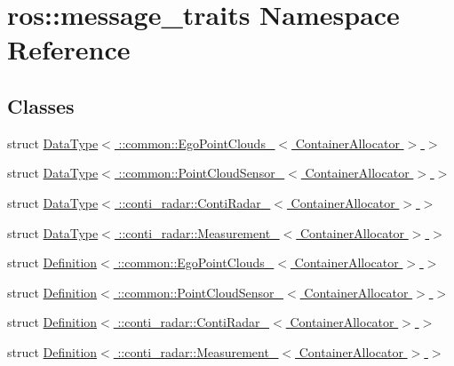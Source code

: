 \hypertarget{namespaceros_1_1message__traits}{}\section{ros\+:\+:message\+\_\+traits Namespace Reference}
\label{namespaceros_1_1message__traits}
\subsection*{Classes}
\begin{DoxyCompactItemize}
\item 
struct \hyperlink{structros_1_1message__traits_1_1DataType_3_01_1_1common_1_1EgoPointClouds___3_01ContainerAllocator_01_4_01_4}{Data\+Type$<$ \+::common\+::\+Ego\+Point\+Clouds\+\_\+$<$ Container\+Allocator $>$ $>$}
\item 
struct \hyperlink{structros_1_1message__traits_1_1DataType_3_01_1_1common_1_1PointCloudSensor___3_01ContainerAllocator_01_4_01_4}{Data\+Type$<$ \+::common\+::\+Point\+Cloud\+Sensor\+\_\+$<$ Container\+Allocator $>$ $>$}
\item 
struct \hyperlink{structros_1_1message__traits_1_1DataType_3_01_1_1conti__radar_1_1ContiRadar___3_01ContainerAllocator_01_4_01_4}{Data\+Type$<$ \+::conti\+\_\+radar\+::\+Conti\+Radar\+\_\+$<$ Container\+Allocator $>$ $>$}
\item 
struct \hyperlink{structros_1_1message__traits_1_1DataType_3_01_1_1conti__radar_1_1Measurement___3_01ContainerAllocator_01_4_01_4}{Data\+Type$<$ \+::conti\+\_\+radar\+::\+Measurement\+\_\+$<$ Container\+Allocator $>$ $>$}
\item 
struct \hyperlink{structros_1_1message__traits_1_1Definition_3_01_1_1common_1_1EgoPointClouds___3_01ContainerAllocator_01_4_01_4}{Definition$<$ \+::common\+::\+Ego\+Point\+Clouds\+\_\+$<$ Container\+Allocator $>$ $>$}
\item 
struct \hyperlink{structros_1_1message__traits_1_1Definition_3_01_1_1common_1_1PointCloudSensor___3_01ContainerAllocator_01_4_01_4}{Definition$<$ \+::common\+::\+Point\+Cloud\+Sensor\+\_\+$<$ Container\+Allocator $>$ $>$}
\item 
struct \hyperlink{structros_1_1message__traits_1_1Definition_3_01_1_1conti__radar_1_1ContiRadar___3_01ContainerAllocator_01_4_01_4}{Definition$<$ \+::conti\+\_\+radar\+::\+Conti\+Radar\+\_\+$<$ Container\+Allocator $>$ $>$}
\item 
struct \hyperlink{structros_1_1message__traits_1_1Definition_3_01_1_1conti__radar_1_1Measurement___3_01ContainerAllocator_01_4_01_4}{Definition$<$ \+::conti\+\_\+radar\+::\+Measurement\+\_\+$<$ Container\+Allocator $>$ $>$}

\end{DoxyCompactItemize}
